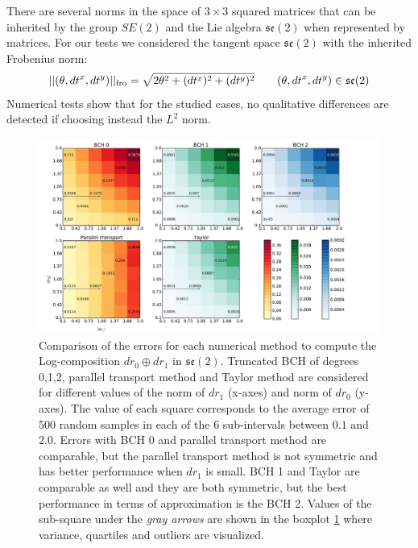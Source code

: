 There are several norms in the space of $3\times 3$ squared matrices that can be inherited by the group $SE(2)$ and the Lie algebra $\mathfrak{se}(2)$ when represented by matrices. For our tests we considered the tangent space $\mathfrak{se}(2)$ with the inherited Frobenius norm:
\begin{align*}
\vert\lvert (\theta,dt^{x},dt^{y}) \rvert\vert_{\text{fro}} = \sqrt{2\theta^{2} + (dt^{x})^2 + (dt^{y})^2} 
\qquad
(\theta,dt^{x},dt^{y}) \in \mathfrak{se}(2)
\end{align*}
Numerical tests show that for the studied cases, no qualitative differences are detected if choosing instead the $L^{2}$ norm.
 \begin{figure}[!ht]
 	\hspace{-1.3cm}
 	\includegraphics[scale=0.50]{figures/se2_image_scale.pdf}
 	\caption{Comparison of the errors for each numerical method to compute the Log-composition $dr_{0} \oplus dr_{1}$ in $\mathfrak{se}(2)$. Truncated BCH of degrees 0,1,2, parallel transport method and Taylor method are considered for different values of the norm of $dr_{1}$ (x-axes) and norm of $dr_{0}$ (y-axes). 
 	The value of each square corresponds to the average error of 500 random samples in each of the 6 sub-intervals between $0.1$ and $2.0$. Errors with BCH 0 and parallel transport method are comparable, but the parallel transport method is not symmetric and has better performance when $dr_{1}$ is small. BCH 1 and Taylor are comparable as well and they are both symmetric, but the best performance in terms of approximation is the BCH 2. Values of the sub-square under the \emph{gray arrows} are shown in the boxplot \ref{fig:se2_image_scale} where variance, quartiles and outliers are visualized.
 	 }
 	\label{fig:se2_image_scale}
 \end{figure}
